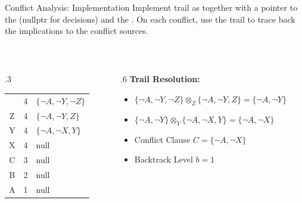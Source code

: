 \documentclass[t]{sdqbeamer2}
\begin{document}
\begin{frame}{Conflict Analysis: Implementation}
Implement trail as  together with a pointer to the  (nullptr for decisions) and the . On each conflict, use the trail to trace back the implications to the conflict sources.
\begin{example}
~\\[1ex]
\begin{columns}[T]
\begin{column}{.3\linewidth}
	\begin{tabular}{ccl}
	\blitz & 4 & $\{\lnot A, \lnot Y, \lnot Z \}$ \\
	Z & 4 & $\{\lnot A, \lnot Y, Z \}$ \\
	Y & 4 & $\{\lnot A, \lnot X, Y \}$ \\
	X & 4 & null\\
	C & 3 & null\\
	B & 2 & null\\
	A & 1 & null\\
	\end{tabular}
\end{column}
\begin{column}{.6\linewidth}
	\textbf{Trail Resolution:}
	\setlength{\leftmargini}{1em}
	\begin{itemize}\setlength{\itemsep}{1ex}
	\item $\{\lnot A, \lnot Y, \lnot Z\}\!\otimes_Z\!\{\lnot A, \lnot Y, Z\}\!=\!\{\lnot A, \lnot Y\}$
	\item $\{\lnot A, \lnot Y\}\!\otimes_Y\!\{\lnot A, \lnot X, Y \}\!=\!\{\lnot A, \lnot X\}$
	\item Conflict Clause $C = \{\lnot A, \lnot X\}$
	\item Backtrack Level $b = 1$
	\end{itemize} 
\end{column}
\end{columns}
\end{example}
\end{frame}
\end{document}
